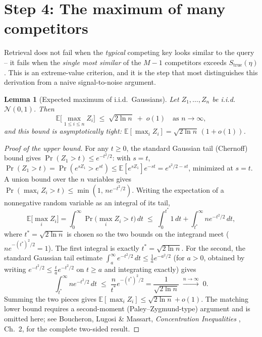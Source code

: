 \documentclass[11pt]{article}
\newtheorem{lemma}{Lemma}
\begin{document}
\section{Step 4: The maximum of many competitors}
\label{sec:step4}

Retrieval does not fail when the \emph{typical} competing key looks similar to the query --
it fails when the \emph{single most similar} of the $M-1$ competitors exceeds
$S_{\text{true}}(\eta)$. This is an extreme-value criterion, and it is the step that most
distinguishes this derivation from a naive signal-to-noise argument.

\begin{lemma}[Expected maximum of i.i.d.\ Gaussians]
\label{lem:extreme}
Let $Z_1,\dots,Z_n$ be i.i.d.\ $\mathcal{N}(0,1)$. Then
\[
\mathbb{E}\Big[\max_{1\le i\le n} Z_i\Big] \;\le\; \sqrt{2\ln n} \;+\; o(1) \quad \text{as } n\to\infty,
\]
and this bound is asymptotically tight: $\mathbb{E}[\max_i Z_i] = \sqrt{2\ln n}\,(1+o(1))$.
\end{lemma}

\begin{proof}[Proof of the upper bound]
For any $t \ge 0$, the standard Gaussian tail (Chernoff) bound gives $\Pr(Z_1 > t) \le
e^{-t^2/2}$: with $s=t$, $\Pr(Z_1>t) = \Pr(e^{sZ_1} > e^{st}) \le \mathbb{E}[e^{sZ_1}]e^{-st} =
e^{s^2/2 - st}$, minimized at $s=t$. A union bound over the $n$ variables gives $\Pr(\max_i Z_i
> t) \le \min(1,\, n e^{-t^2/2})$. Writing the expectation of a nonnegative random variable as
an integral of its tail,
\[
\mathbb{E}\Big[\max_i Z_i\Big] = \int_0^\infty \Pr\Big(\max_i Z_i > t\Big)\,dt
\;\le\; \int_0^{t^*} 1 \,dt + \int_{t^*}^\infty n e^{-t^2/2}\,dt,
\]
where $t^* = \sqrt{2\ln n}$ is chosen so the two bounds on the integrand meet ($n e^{-(t^*)^2/2}
= 1$). The first integral is exactly $t^* = \sqrt{2\ln n}$. For the second, the standard
Gaussian tail estimate $\int_a^\infty e^{-t^2/2}\,dt \le \tfrac{1}{a}e^{-a^2/2}$ (for $a>0$,
obtained by writing $e^{-t^2/2} \le \tfrac{t}{a}e^{-t^2/2}$ on $t\ge a$ and integrating exactly)
gives
\[
\int_{t^*}^\infty n e^{-t^2/2}\,dt \;\le\; \frac{n}{t^*}e^{-(t^*)^2/2} = \frac{1}{\sqrt{2\ln n}} \;\xrightarrow{n\to\infty}\; 0.
\]
Summing the two pieces gives $\mathbb{E}[\max_i Z_i] \le \sqrt{2\ln n} + o(1)$. The matching
lower bound requires a second-moment (Paley--Zygmund-type) argument and is omitted here; see
Boucheron, Lugosi \& Massart, \textit{Concentration Inequalities} \cite{blm2013}, Ch.\ 2, for
the complete two-sided result.
\end{proof}
\end{document}
